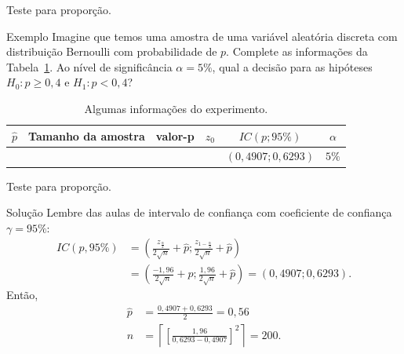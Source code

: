 \documentclass[8pt]{beamer}
\begin{document}
\begin{frame}{Teste para proporção.}

\large
\begin{block}{Exemplo}
	Imagine que temos uma amostra de uma variável aleatória discreta com distribuição Bernoulli com probabilidade de $p$. Complete as informações da Tabela~\ref{tab:proportion-unilateral-h0-upper}. Ao nível de significância $\alpha=5\%$, qual a decisão para as hipóteses $H_0: p \geq 0,4$  e $H_1: p < 0,4$?
	\begin{table}[ht]
		\centering
		\begin{tabular}{c|c|c|c|c|c}
			\toprule[0.05cm]
			$\hat{p}$ & Tamanho da amostra & valor-p & $z_0$ & $IC(p; 95\%)$ & $\alpha$ \\ 
			\midrule
			&  &  &  & $(0,4907;0,6293)$ & $5\%$ \\ 
			\bottomrule[0.05cm]
		\end{tabular}
		\caption{Algumas informações do experimento.} 
		\label{tab:proportion-unilateral-h0-upper}
	\end{table}
\end{block}

\normalsize
\end{frame}

\begin{frame}{Teste para proporção.}

\large
\begin{block}{Solução}
	Lembre das aulas de intervalo de confiança com coeficiente de confiança $\gamma=95\%$:
	\begin{align*}
		IC(p, 95\%) &= \left( \frac{z_\frac{\alpha}{2}}{2\sqrt{n}} + \hat{p};  \frac{z_{1-\frac{\alpha}{2}}}{2\sqrt{n}} + \hat{p} \right)\\
		&= \left( \frac{-1,96}{2\sqrt{n}} + \hat{p}; \frac{1,96}{2\sqrt{n}} + \hat{p} \right) = (0,4907; 0,6293).
	\end{align*}
	Então,
	\begin{align*}
		\hat{p} &= \frac{0,4907 + 0,6293}{2} = 0,56 \\
		n &= \left\lceil \left[ \frac{1,96}{ 0,6293 - 0,4907 } \right]^2 \right\rceil = 200.
	\end{align*}
\end{block}
\normalsize
\end{frame}
\end{document}
